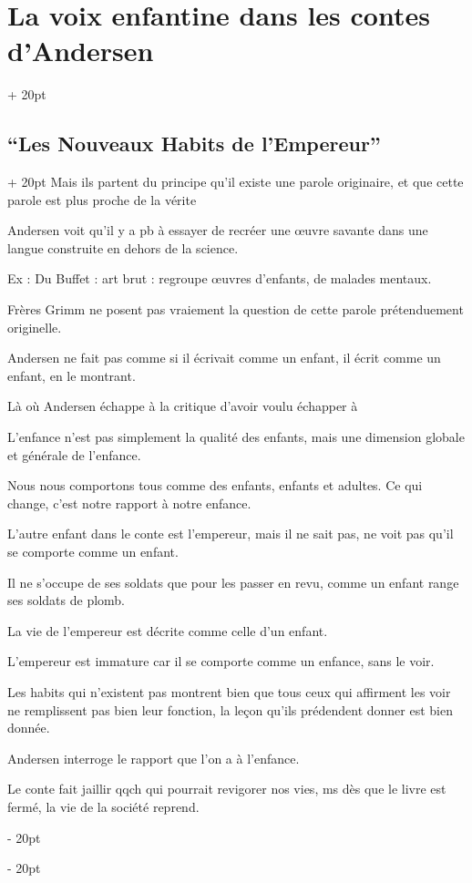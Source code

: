 \documentclass[a4paper, 12pt, twoside]{article}
\newcommand{\ind}[1][20pt]{\advance\leftskip + #1}
\newcommand{\deind}[1][20pt]{\advance\leftskip - #1}
\newenvironment{indt}[2][20pt]{#2 \par \ind[#1]}{\par \deind} %
\begin{document}
\begin{indt}{\section{La voix enfantine dans les contes d'Andersen}}
\begin{indt}{\subsection{``Les Nouveaux Habits de l'Empereur''}}
            Mais ils partent du principe qu'il existe une parole originaire, et que cette parole est plus proche de la vérite
            
            Andersen voit qu'il y a pb à essayer de recréer une \oe uvre savante dans une langue construite en dehors de la science.
            
            Ex : Du Buffet : art brut : regroupe \oe uvres d'enfants, de malades mentaux.
            
            Frères Grimm ne posent pas vraiement la question de cette parole prétenduement originelle.
            
            Andersen ne fait pas comme si il écrivait comme un enfant, il écrit comme un enfant, en le montrant.
            
            Là où Andersen échappe à la critique d'avoir voulu échapper à
            
            L'enfance n'est pas simplement la qualité des enfants, mais une dimension globale et générale de l'enfance.
            
            Nous nous comportons tous comme des enfants, enfants et adultes. Ce qui change, c'est notre rapport à notre enfance.
            
            
            L'autre enfant dans le conte est l'empereur, mais il ne sait pas, ne voit pas qu'il se comporte comme un enfant.
            
            Il ne s'occupe de ses soldats que pour les passer en revu, comme un enfant range ses soldats de plomb.
            
            La vie de l'empereur est décrite comme celle d'un enfant.
            
            L'empereur est immature car il se comporte comme un enfance, sans le voir.
            
            Les habits qui n'existent pas montrent bien que tous ceux qui affirment les voir ne remplissent pas bien leur fonction, la leçon qu'ils prédendent donner est bien donnée.
            
            Andersen interroge le rapport que l'on a à l'enfance.
            
            Le conte fait jaillir qqch qui pourrait revigorer nos vies, ms dès que le livre est fermé, la vie de la société reprend.
        \end{indt}
        

\end{indt}
\end{document}
